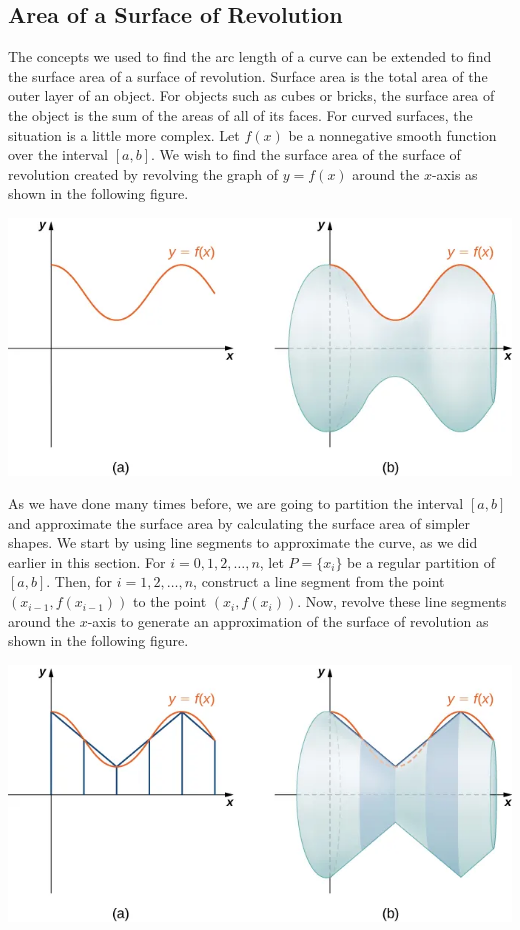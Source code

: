 \documentclass{report}
\begin{document}
    \subsection*{Area of a Surface of Revolution}
    \bigbreak \noindent 
    The concepts we used to find the arc length of a curve can be extended to find the surface area of a surface of revolution. Surface area is the total area of the outer layer of an object. For objects such as cubes or bricks, the surface area of the object is the sum of the areas of all of its faces. For curved surfaces, the situation is a little more complex. Let $f(x)$ be a nonnegative smooth function over the interval $[a, b]$. We wish to find the surface area of the surface of revolution created by revolving the graph of $y = f(x)$ around the $x$-axis as shown in the following figure.
    \bigbreak \noindent 
    \begin{center}
        \includegraphics[scale=0.5]{./figures/graph31.png}
    \end{center}
    \bigbreak \noindent 
    As we have done many times before, we are going to partition the interval $[a,b]$ and approximate the surface area by calculating the surface area of simpler shapes. We start by using line segments to approximate the curve, as we did earlier in this section. For $i=0,1,2,\ldots,n$, let $P=\{x_i\}$ be a regular partition of $[a,b]$. Then, for $i=1,2,\ldots,n$, construct a line segment from the point $(x_{i-1},f(x_{i-1}))$ to the point $(x_i,f(x_i))$. Now, revolve these line segments around the $x$-axis to generate an approximation of the surface of revolution as shown in the following figure.
    \bigbreak \noindent 
    \begin{center}
        \includegraphics[scale=0.5]{./figures/graph32.png}
    \end{center}
\end{document}
